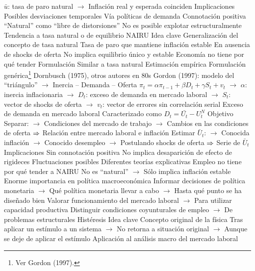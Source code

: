 \documentclass{nuevotema}
\begin{document}
\begin{esquemal}
				\4[] $\bar{u}$: tasa de paro natural
				\4[] $\to$ Inflación real y esperada coinciden
			\3 Implicaciones
				\4 Posibles desviaciones temporales
				\4[] Vía políticas de demanda
				\4 Connotación positiva
				\4[] ``Natural'' como ``libre de distorsiones''
				\4 No es posible explotar estructuralmente
				\4[] Tendencia a tasa natural o de equilibrio
		\2 NAIRU
			\3 Idea clave
				\4 Generalización del concepto de tasa natural
				\4 Tasa de paro que mantiene inflación estable
				\4[] En ausencia de shocks de oferta
				\4 No implica equilibrio único y estable
				\4[$\then$] Economía no tiene por qué tender
			\3 Formulación
				\4 Similar a tasa natural
			\3 Estimación empírica
				\4 Formulación genérica\footnote{Ver Gordon (1997).}
				\4[] Dornbusch (1975), otros autores en 80s
				\4[] Gordon (1997): modelo del ``triángulo''
				\4[] $\to$ Inercia -- Demanda -- Oferta
				\4[] $\pi_t = \alpha \pi_{t-1} + \beta D_t + \gamma S_t + v_t$
				\4[] $\to$ $\alpha$: inercia inflacionaria
				\4[] $\to$ $D_t$: exceso de demanda en mercado laboral
				\4[] $\to$ $S_t$: vector de shocks de oferta
				\4[] $\to$ $v_t$: vector de errores sin correlación serial
				\4 Exceso de demanda en mercado laboral
				\4[] Caracterizado como $D_t = \bar{U_t} - U_t^N$
				\4 Objetivo
				\4[] Separar:
				\4[] $\to$ Condiciones del mercado de trabajo
				\4[] $\to$ Cambios en las condiciones de oferta
				\4[] $\then$ Relación entre mercado laboral e inflación
				\4[] Estimar $\bar{U}_t$:
				\4[] $\to$ Conocida inflación
				\4[] $\to$ Conocido desempleo
				\4[] $\to$ Postulando shocks de oferta
				\4[] $\then$ Serie de $\bar{U}_t$
			\3 Implicaciones
				\4 Sin connotación positiva
				\4[] No implica desaparición de efecto de rigideces
				\4 Fluctuaciones posibles
				\4[] Diferentes teorías explicativas
				\4 Empleo no tiene por qué tender a NAIRU
				\4[] No es ``natural''
				\4[] $\to$ Sólo implica inflación estable
				\4 Enorme importancia en política macroeconómica
				\4[] Informar decisiones de política monetaria
				\4[] $\to$ Qué política monetaria llevar a cabo
				\4[] $\to$ Hasta qué punto se ha diseñado bien
				\4[] Valorar funcionamiento del mercado laboral
				\4[] $\to$ Para utilizar capacidad productiva
				\4[] Distinguir condiciones coyunturales de empleo
				\4[] $\to$ De problemas estructurales
		\2 Histéresis
			\3 Idea clave
				\4 Concepto original de la física
				\4[] Tras aplicar un estímulo a un sistema
				\4[] $\to$ No retorna a situación original
				\4[] $\to$ Aunque se deje de aplicar el estímulo
				\4 Aplicación al análisis macro del mercado laboral

\end{esquemal}
\end{document}
